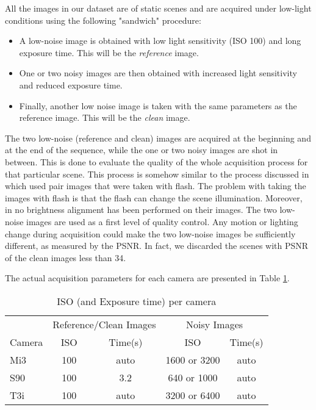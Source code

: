 \documentclass[review]{elsarticle}
\begin{document}
 All the images in our dataset are of static scenes and are acquired under low-light  conditions using the following "sandwich" procedure:
\begin{itemize}
\item A low-noise image is obtained with low light sensitivity (ISO 100) and long exposure time. This will be the {\em reference} image.
\item One or two noisy images are then obtained with increased light sensitivity and reduced exposure time. 
\item Finally, another low noise image is taken with the same parameters as the reference image.  This will be the {\em clean} image.
\end{itemize}

The two low-noise (reference and clean) images are acquired at the beginning and at the end of the sequence, while the one or two noisy images are shot in between. This is done to evaluate the quality of the whole acquisition process for that particular scene. This process is somehow similar to the process discussed in \cite{NoiseEstimation} which used pair images that were taken with flash. The problem with taking the images with flash is that the flash can change the scene illumination. Moreover, in  \cite{NoiseEstimation} no brightness alignment has been performed on their images. 
The two low-noise images are used as a first level of quality control. Any motion or lighting change during acquisition could make the two low-noise images be sufficiently different, as measured by the PSNR. In fact, we discarded the scenes with PSNR of the clean images less than 34.

The actual acquisition parameters for each camera are presented in Table \ref{tab:camerainfo}.
\begin{table}[htb]
\vspace{-4mm}
\caption{ISO (and Exposure time) per camera \label{tab:camerainfo}}
\vskip -0mm
\centering
\begin{tabular}{|l |c c|c c|}
\hline	
&\multicolumn{2}{c}{ Reference/Clean Images }	&\multicolumn{2}{|c|}{Noisy Images}\\
Camera & ISO &Time(s) & ISO &Time(s)\\
\hline
Mi3\phantom{$I^I$}		&100  &auto	&1600 or 3200  &auto	\\
S90		&100 &3.2	&640 or 1000 &auto	\\
T3i 		&100 &auto	&3200 or 6400 &auto	\\
\hline
\end{tabular}
\vspace{-4mm}
\end{table}
\end{document}
